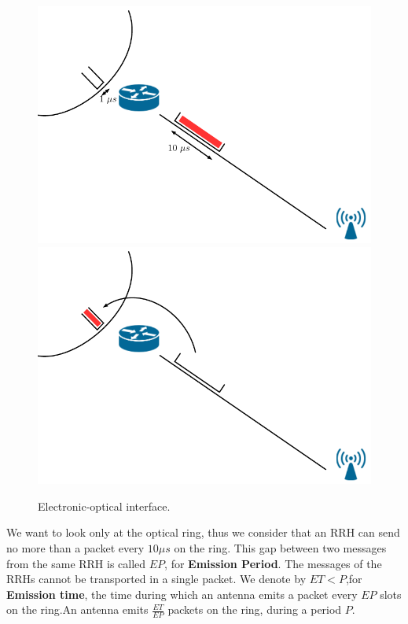 \documentclass[a4paper,10pt,french,english]{article}
\begin{document}
\begin{figure}[h!]
\begin{center}   

      \includegraphics[scale=0.3]{slot1.pdf}
  \includegraphics[scale=0.3]{slot2.pdf}
     \caption{Electronic-optical interface.}
     
\end{center}
  \end{figure}
  
   We want to look only at the optical ring, thus we consider that an RRH can send no more than a packet every $10\mu s$ on the ring. This gap between two messages from the same RRH is called $EP$, for {\bf Emission Period}.
    The messages of the RRHs cannot be transported in a single packet. We denote by $ET<P$,for {\bf Emission time}, the time during which an antenna emits a packet every $EP$ slots on the ring.An antenna emits $\frac{ET}{EP}$ packets on the ring, during a period $P$.
    	    
\end{document}
